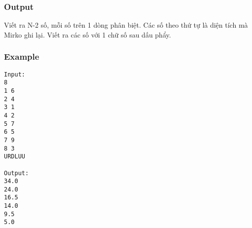 \subsubsection{   Output  }

   Viết ra N-2 số, mỗi số trên 1 dòng phân biệt. Các số theo thứ tự là diện tích mà Mirko ghi lại. Viết ra các số với 1 chữ số sau dấu phẩy.  

\subsubsection{   Example  }
\begin{verbatim}
Input:
8
1 6
2 4
3 1
4 2
5 7
6 5
7 9
8 3
URDLUU

Output:
34.0
24.0
16.5
14.0
9.5
5.0
\end{verbatim}